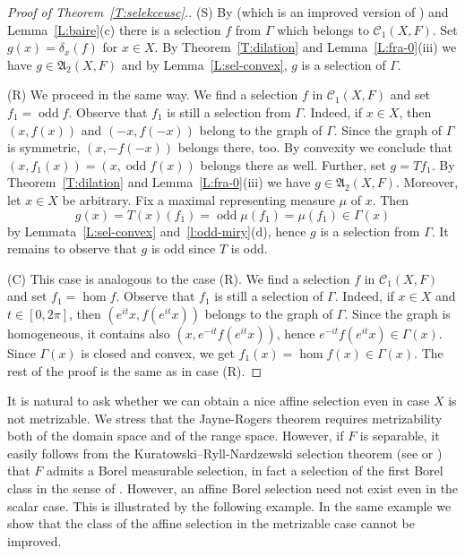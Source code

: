 \documentclass{amsart}
\numberwithin{equation}{section}
\theoremstyle{definition}
\def\fra{\mathfrak{A}}
\def\C{\mathcal C}
\def\hom{\operatorname{hom}}
\def\odd{\operatorname{odd}}
\begin{document}
\begin{proof}[Proof of Theorem~\ref{T:selekceusc}.]
(S) By \cite[Theorem]{jaro82c} (which is an improved version of \cite[Theorem 2]{jaro82}) and Lemma~\ref{L:baire}(c) there is a selection $f$ from $\Gamma$ which belongs to $\C_1(X,F)$. Set $g(x)=\delta_x(f)$ for $x\in X$.
By Theorem~\ref{T:dilation} and Lemma~\ref{L:fra-0}(iii) we have $g\in\fra_2(X,F)$ and by Lemma~\ref{L:sel-convex}, $g$ is a selection of $\Gamma$.

(R) We proceed in the same way. We find a selection $f$ in $\C_1(X,F)$ and set $f_1=\odd f$. Observe that $f_1$ is still a selection from $\Gamma$. Indeed, if $x\in X$, then $(x,f(x))$ and $(-x,f(-x))$ belong to the graph of $\Gamma$. Since the graph of $\Gamma$ is symmetric, $(x,-f(-x))$ belongs there, too. By convexity we conclude that $(x,f_1(x))=(x,\odd f(x))$ belongs there as well. Further, set $g=Tf_1$. By Theorem~\ref{T:dilation} and Lemma~\ref{L:fra-0}(iii) we have $g\in\fra_2(X,F)$. Moreover, let $x\in X$ be arbitrary. Fix a maximal representing measure $\mu$ of $x$. Then
$$g(x)=T(x)(f_1)=\odd\mu(f_1)= \mu(f_1)\in \Gamma(x)$$
by Lemmata~\ref{L:sel-convex} and~\ref{l:odd-miry}(d), hence $g$ is a selection from $\Gamma$. It remains to observe that $g$ is odd since $T$ is odd.

(C) This case is analogous to the case (R). We find a selection $f$ in $\C_1(X,F)$ and set $f_1=\hom f$. Observe that $f_1$ is still a selection of $\Gamma$. Indeed, if $x\in X$ and $t\in[0,2\pi]$, then $(e^{it}x,f(e^{it}x))$ belongs to the graph of $\Gamma$. Since the graph is homogeneous, it contains also $(x,e^{-it}f(e^{it}x))$, hence $e^{-it}f(e^{it}x)\in\Gamma(x)$. Since $\Gamma(x)$ is closed and convex, we get $f_1(x)=\hom f(x)\in\Gamma(x)$. The rest of the proof is the same as in case (R).
\end{proof}

It is natural to ask whether we can obtain a nice affine selection even in case $X$ is not metrizable. We stress that the Jayne-Rogers theorem requires metrizability both of the domain space and of the range space. However, if $F$ is separable, it easily follows from the Kuratowski--Ryll-Nardzewski selection theorem (see \cite{kurn} or \cite[Theorem 5.2.1]{srivastava}) that $F$ admits a Borel measurable selection, in fact a selection of the first Borel class in the sense of \cite{spurny-amh}. However, an affine Borel selection need not exist even in the scalar case. This is illustrated by the following example.
In the same example we show that the class of the affine selection in the metrizable case cannot be improved.
\end{document}

